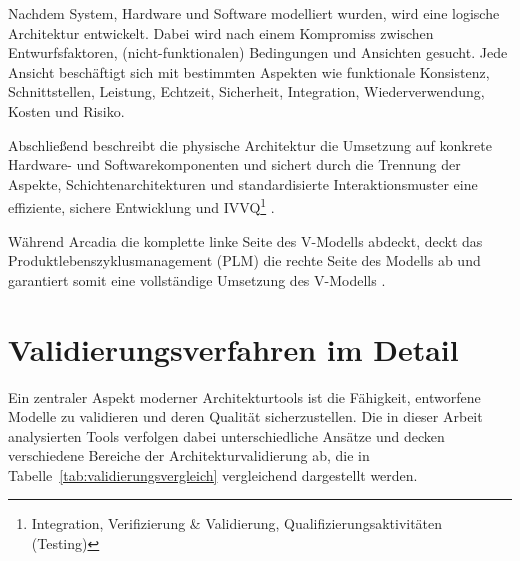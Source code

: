 Nachdem System, Hardware und Software modelliert wurden, wird eine logische Architektur entwickelt. Dabei wird nach einem Kompromiss zwischen Entwurfsfaktoren, (nicht-funktionalen) Bedingungen und Ansichten gesucht. Jede Ansicht beschäftigt sich mit bestimmten Aspekten wie funktionale Konsistenz, Schnittstellen, Leistung, Echtzeit, Sicherheit, Integration, Wiederverwendung, Kosten und Risiko.

Abschließend beschreibt die physische Architektur die Umsetzung auf konkrete Hardware- und Softwarekomponenten und sichert durch die Trennung der Aspekte, Schichtenarchitekturen und standardisierte Interaktionsmuster eine effiziente, sichere Entwicklung und IVVQ\footnote{Integration, Verifizierung \& Validierung, Qualifizierungsaktivitäten (Testing)} \cite{let24}.

Während Arcadia die komplette linke Seite des V-Modells abdeckt, deckt das Produktlebenszyklusmanagement (PLM) die rechte Seite des Modells ab und garantiert somit eine vollständige Umsetzung des V-Modells \cite{2024arcadia}.

\section{Validierungsverfahren im Detail}

Ein zentraler Aspekt moderner Architekturtools ist die Fähigkeit, entworfene Modelle zu validieren und deren Qualität sicherzustellen. Die in dieser Arbeit analysierten Tools verfolgen dabei unterschiedliche Ansätze und decken verschiedene Bereiche der Architekturvalidierung ab, die in Tabelle~\ref{tab:validierungsvergleich} vergleichend dargestellt werden.

